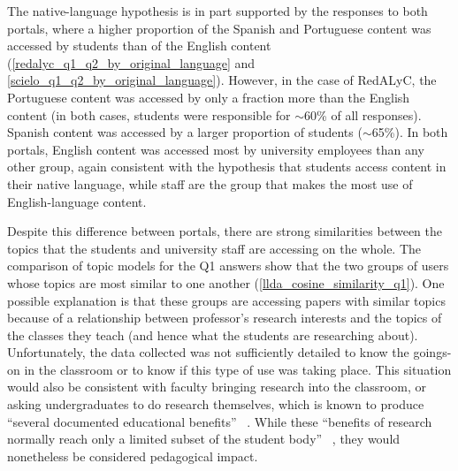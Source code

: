 The native-language hypothesis is in part supported by the responses to both portals, where a higher proportion of the Spanish and Portuguese content was accessed by students than of the English content (\autoref{redalyc_q1_q2_by_original_language} and \autoref{scielo_q1_q2_by_original_language}). However, in the case of RedALyC, the Portuguese content was accessed by only a fraction more than the English content (in both cases, students were responsible for \ensuremath{\sim}60\% of all responses). Spanish content was accessed by a larger proportion of students (\ensuremath{\sim}65\%). In both portals, English content was accessed most by university employees than any other group, again consistent with the hypothesis that students access content in their native language, while staff are the group that makes the most use of English-language content.

Despite this difference between portals, there are strong similarities between the topics that the students and university staff are accessing on the whole. The comparison of topic models for the Q1 answers show that the two groups of users whose topics are most similar to one another (\autoref{llda_cosine_similarity_q1}). One possible explanation is that these groups are accessing papers with similar topics because of a relationship between professor's research interests and the topics of the classes they teach (and hence what the students are researching about). Unfortunately, the data collected was not sufficiently detailed to know the goings-on in the classroom or to know if this type of use was taking place. This situation would also be consistent with faculty bringing research into the classroom, or asking undergraduates to do research themselves, which is known to produce ``several documented educational benefits'' ~\citep[p. 190]{Designs2007}. While these ``benefits of research normally reach only a limited subset of the student body'' ~\citep[p. 190]{Designs2007}, they would nonetheless be considered pedagogical impact.

